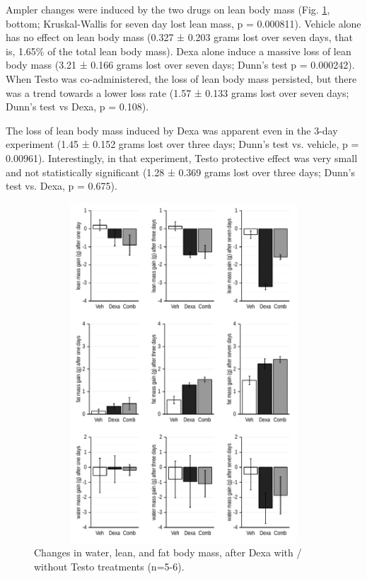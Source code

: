 \documentclass[12pt,english]{report}\usepackage[]{graphicx}\usepackage[]{color}
\newenvironment{knitrout}{}{} %
\begin{document}
Ampler changes were induced by the two drugs on lean body mass (Fig.
\ref{fig:Changes-in-water-lean-and-fat}, bottom; Kruskal-Wallis for
seven day lost lean mass, p = 0.000811).
Vehicle alone has no effect on lean body mass (0.327
± 0.203 grams lost
over seven days, that is, 1.65\%
of the total lean body mass). Dexa alone induce a massive loss of
lean body mass (3.21
± 0.166 grams lost
over seven days; Dunn's test p = 0.000242).
When Testo was co-administered, the loss of lean body mass persisted,
but there was a trend towards a lower loss rate (1.57
± 0.133 grams lost
over seven days; Dunn's test vs Dexa, p = 0.108).

The loss of lean body mass induced by Dexa was apparent even in the
3-day experiment (1.45
± 0.152 grams lost
over three days; Dunn's test vs. vehicle, p = 0.00961).
Interestingly, in that experiment, Testo protective effect was very
small and not statistically significant (1.28
± 0.369 grams lost
over three days; Dunn's test vs. Dexa, p = 0.675). 

\begin{figure}
\begin{knitrout}
\color{fgcolor}
\includegraphics[width=6.5in,height=5in]{figure/leanfat-1} 

\end{knitrout}

\protect\caption[Changes in water, lean, and fat body mass, after Dexa with / without
Testo treatments]{Changes in water, lean, and fat body mass, after Dexa with / without
Testo treatments (n=5-6).\label{fig:Changes-in-water-lean-and-fat}}
\end{figure}
\end{document}
